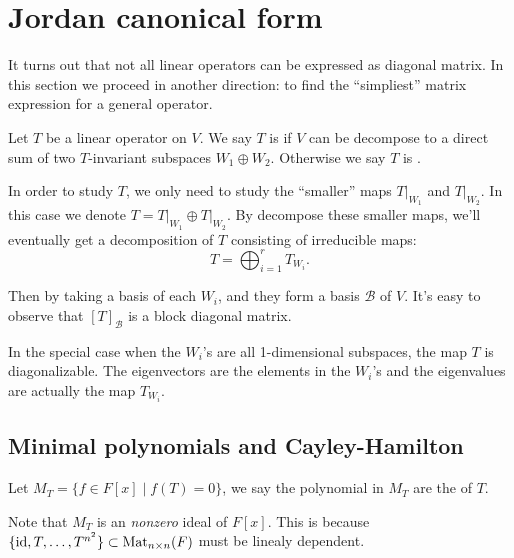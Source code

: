\section{Jordan canonical form}
\label{sec:Jordan canonical form}

It turns out that not all linear operators can be expressed
as diagonal matrix. In this section we proceed in another
direction: to find the ``simpliest'' matrix expression for a
general operator.

\begin{definition}
	Let $T$ be a linear operator on  $V$.
	We say  $T$ is  if $V$ can be decompose to
	a direct sum of two $T$-invariant subspaces $W_1\oplus W_2$.
	Otherwise we say $T$ is .
\end{definition}

In order to study $T$, we only need to study the ``smaller'' maps $T\big|_{W_1}$
and $T\big|_{W_2}$. In this case we denote $T = T\big|_{W_1}\oplus T\big|_{W_2}$.
By decompose these smaller maps, we'll eventually
get a decomposition of $T$ consisting of irreducible maps:
\[
T = \bigoplus_{i=1}^r T_{W_i}.
\]

Then by taking a basis of each $W_i$, and they form a basis $\mathcal{B}$ of $V$.
It's easy to observe that  $[T]_{\mathcal{B}}$ is a block diagonal matrix.

In the special case when the $W_i$'s are all 1-dimensional subspaces,
the map $T$ is diagonalizable. The eigenvectors are the elements in the
$W_i$'s and the eigenvalues are actually the map $T_{W_i}$.

\subsection{Minimal polynomials and Cayley-Hamilton}
\label{sub:Minimal polynomials and Cayley-Hamilton}

\begin{definition}
	Let $M_T = \{f\in F[x]\mid f(T) = 0\}$, we say the polynomial in
	$M_T$ are the  of $T$.

	Note that $M_T$ is an \textit{nonzero} ideal of $F[x]$.
	This is because $\{\operatorname{id}, T, \dots, T^{n^2}\}\subset \mathrm{Mat}_{n \times n}(F)$
	must be linealy dependent.
\end{definition}
